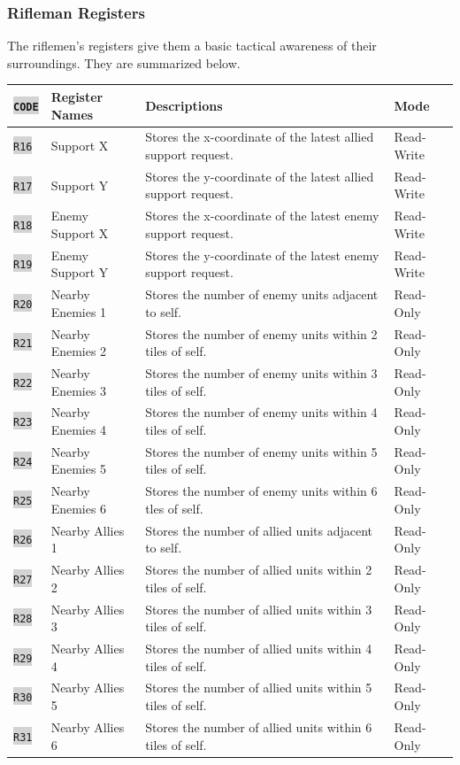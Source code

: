 \documentclass{article}
\newcommand{\vnscode}[1]{\colorbox{lightgray}{\lstinline[language=vns]{#1}}}
\begin{document}
\subsubsection{Rifleman Registers}

The riflemen's registers give them a basic tactical awareness of their
surroundings. They are summarized below.

\begin{minipage}{\textwidth}
\centering
\begin{tabular}{llll}
    \hline \vnscode{CODE} & Register Names & Descriptions & Mode \\ \hline
    \vnscode{R16} & Support X & Stores the x-coordinate of the latest allied support request. & Read-Write \\
    \vnscode{R17} & Support Y & Stores the y-coordinate of the latest allied support request. & Read-Write \\
    \vnscode{R18} & Enemy Support X & Stores the x-coordinate of the latest enemy support request. & Read-Write \\
    \vnscode{R19} & Enemy Support Y & Stores the y-coordinate of the latest enemy support request. & Read-Write \\
    \vnscode{R20} & Nearby Enemies 1 & Stores the number of enemy units adjacent to self. & Read-Only \\
    \vnscode{R21} & Nearby Enemies 2 & Stores the number of enemy units within 2 tiles of self. & Read-Only \\
    \vnscode{R22} & Nearby Enemies 3 & Stores the number of enemy units within 3 tiles of self. & Read-Only \\
    \vnscode{R23} & Nearby Enemies 4 & Stores the number of enemy units within 4 tiles of self. & Read-Only \\
    \vnscode{R24} & Nearby Enemies 5 & Stores the number of enemy units within 5 tiles of self. & Read-Only \\
    \vnscode{R25} & Nearby Enemies 6 & Stores the number of enemy units within 6 tles of self. & Read-Only \\
    \vnscode{R26} & Nearby Allies 1 & Stores the number of allied units adjacent to self. & Read-Only \\
    \vnscode{R27} & Nearby Allies 2 & Stores the number of allied units within 2 tiles of self. & Read-Only \\
    \vnscode{R28} & Nearby Allies 3 & Stores the number of allied units within 3 tiles of self. & Read-Only \\
    \vnscode{R29} & Nearby Allies 4 & Stores the number of allied units within 4 tiles of self. & Read-Only \\
    \vnscode{R30} & Nearby Allies 5 & Stores the number of allied units within 5 tiles of self. & Read-Only \\
    \vnscode{R31} & Nearby Allies 6 & Stores the number of allied units within 6 tiles of self. & Read-Only \\
\end{tabular}
\end{minipage}
\end{document}
